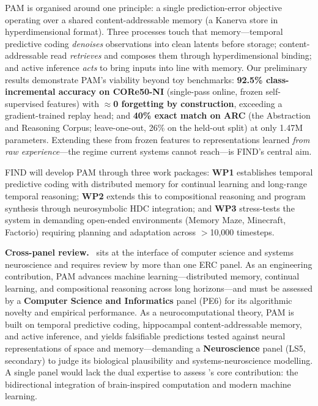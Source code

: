 PAM is organised around one principle: a single prediction-error objective operating over a shared content-addressable memory (a Kanerva store in hyperdimensional format). Three processes touch that memory---temporal predictive coding \textit{denoises} observations into clean latents before storage; content-addressable read \textit{retrieves} and composes them through hyperdimensional binding; and active inference \textit{acts} to bring inputs into line with memory. Our preliminary results demonstrate PAM's viability beyond toy benchmarks: \textbf{92.5\% class-incremental accuracy on CORe50-NI} (single-pass online, frozen self-supervised features) with \textbf{$\approx$0 forgetting by construction}, exceeding a gradient-trained replay head; and \textbf{40\% exact match on ARC} (the Abstraction and Reasoning Corpus; leave-one-out, 26\% on the held-out split) at only 1.47M parameters. Extending these from frozen features to representations learned \textit{from raw experience}---the regime current systems cannot reach---is FIND's central aim.

FIND will develop PAM through three work packages: \textbf{WP1} establishes temporal predictive coding with distributed memory for continual learning and long-range temporal reasoning; \textbf{WP2} extends this to compositional reasoning and program synthesis through neurosymbolic HDC integration; and \textbf{WP3} stress-tests the system in demanding open-ended environments (Memory Maze, Minecraft, Factorio) requiring planning and adaptation across $>$10,000 timesteps.

\vspace{3mm}
\noindent\textbf{Cross-panel review.} \project\ sits at the interface of computer science and systems neuroscience and requires review by more than one ERC panel. As an engineering contribution, PAM advances machine learning---distributed memory, continual learning, and compositional reasoning across long horizons---and must be assessed by a \textbf{Computer Science and Informatics} panel (PE6) for its algorithmic novelty and empirical performance. As a neurocomputational theory, PAM is built on temporal predictive coding, hippocampal content-addressable memory, and active inference, and yields falsifiable predictions tested against neural representations of space and memory---demanding a \textbf{Neuroscience} panel (LS5, secondary) to judge its biological plausibility and systems-neuroscience modelling. A single panel would lack the dual expertise to assess \project's core contribution: the bidirectional integration of brain-inspired computation and modern machine learning.

\newpage
